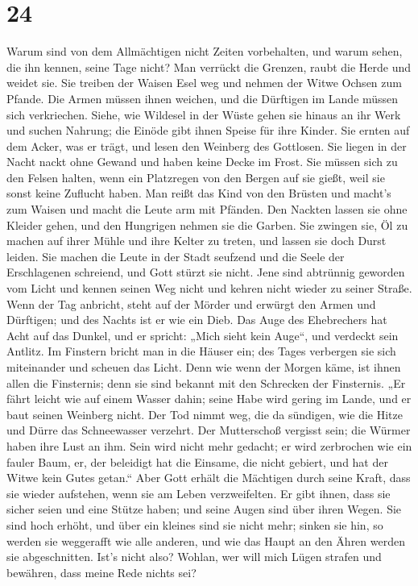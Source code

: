 \hypertarget{section-23}{%
\section{24}\label{section-23}}

 Warum sind von dem Allmächtigen nicht Zeiten vorbehalten,
und warum sehen, die ihn kennen, seine Tage nicht?  Man
verrückt die Grenzen, raubt die Herde und weidet sie.  Sie
treiben der Waisen Esel weg und nehmen der Witwe Ochsen zum Pfande.
 Die Armen müssen ihnen weichen, und die Dürftigen im
Lande müssen sich verkriechen.  Siehe, wie Wildesel in der
Wüste gehen sie hinaus an ihr Werk und suchen Nahrung; die Einöde gibt
ihnen Speise für ihre Kinder.  Sie ernten auf dem Acker,
was er trägt, und lesen den Weinberg des Gottlosen.  Sie
liegen in der Nacht nackt ohne Gewand und haben keine Decke im Frost.
 Sie müssen sich zu den Felsen halten, wenn ein Platzregen
von den Bergen auf sie gießt, weil sie sonst keine Zuflucht haben.
 Man reißt das Kind von den Brüsten und macht's zum Waisen
und macht die Leute arm mit Pfänden.  Den Nackten lassen
sie ohne Kleider gehen, und den Hungrigen nehmen sie die Garben.
 Sie zwingen sie, Öl zu machen auf ihrer Mühle und ihre
Kelter zu treten, und lassen sie doch Durst leiden.  Sie
machen die Leute in der Stadt seufzend und die Seele der Erschlagenen
schreiend, und Gott stürzt sie nicht.  Jene sind
abtrünnig geworden vom Licht und kennen seinen Weg nicht und kehren
nicht wieder zu seiner Straße.  Wenn der Tag anbricht,
steht auf der Mörder und erwürgt den Armen und Dürftigen; und des Nachts
ist er wie ein Dieb.  Das Auge des Ehebrechers hat Acht
auf das Dunkel, und er spricht: „Mich sieht kein Auge``, und verdeckt
sein Antlitz.  Im Finstern bricht man in die Häuser ein;
des Tages verbergen sie sich miteinander und scheuen das Licht.
 Denn wie wenn der Morgen käme, ist ihnen allen die
Finsternis; denn sie sind bekannt mit den Schrecken der Finsternis.
 „Er fährt leicht wie auf einem Wasser dahin; seine Habe
wird gering im Lande, und er baut seinen Weinberg nicht. 
Der Tod nimmt weg, die da sündigen, wie die Hitze und Dürre das
Schneewasser verzehrt.  Der Mutterschoß vergisst sein;
die Würmer haben ihre Lust an ihm. Sein wird nicht mehr gedacht; er wird
zerbrochen wie ein fauler Baum,  er, der beleidigt hat
die Einsame, die nicht gebiert, und hat der Witwe kein Gutes getan.``
 Aber Gott erhält die Mächtigen durch seine Kraft, dass
sie wieder aufstehen, wenn sie am Leben verzweifelten. 
Er gibt ihnen, dass sie sicher seien und eine Stütze haben; und seine
Augen sind über ihren Wegen.  Sie sind hoch erhöht, und
über ein kleines sind sie nicht mehr; sinken sie hin, so werden sie
weggerafft wie alle anderen, und wie das Haupt an den Ähren werden sie
abgeschnitten.  Ist's nicht also? Wohlan, wer will mich
Lügen strafen und bewähren, dass meine Rede nichts sei?

